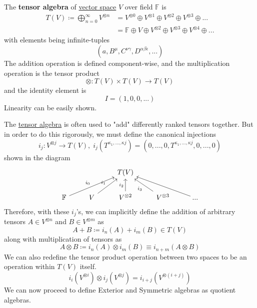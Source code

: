   \begin{definition}
    \label{def:tensor-algebra}
    The \textbf{tensor algebra} of \hyperref[def:vector-space]{vector space} $V$ over field $\mathbb{F}$ is 
    \begin{align*}
      T(V) \coloneqq \bigoplus_{n = 0}^{\infty} V^{\otimes n} & = V^{\otimes 0} \oplus V^{\otimes 1} \oplus V^{\otimes 2} \oplus V^{\otimes 3} \oplus ... \\
      & = \mathbb{F} \oplus V \oplus V^{\otimes 2} \oplus V^{\otimes 3} \oplus V^{\otimes 4} \oplus ...
    \end{align*}
    with elements being infinite-tuples
    \begin{equation}
      (a, B^\mu, C^{\nu \gamma}, D^{\alpha \beta \epsilon}, ...)
    \end{equation}
    The addition operation is defined component-wise, and the multiplication operation is the tensor product 
    \begin{equation}
      \otimes: T(V) \times T(V) \to T(V)
    \end{equation}
    and the identity element is
    \begin{equation}
      I = (1, 0, 0, ...)
    \end{equation}
    Linearity can be easily shown. 
  \end{definition}

  The \hyperref[def:tensor-algebra]{tensor algebra} is often used to "add" differently ranked tensors together. But in order to do this rigorously, we must define the canonical injections
  \begin{equation}
    i_j: V^{\otimes j} \to T(V), \; i_j (T^{\kappa_1, ..., \kappa j}) = (0, ...,0, T^{\kappa_1, ..., \kappa j}, 0, ..., 0) 
  \end{equation}
  shown in the diagram
  \begin{equation}
    \begin{tikzcd}
          & & T(V) & & \\
          \mathbb{F} \arrow{urr}{i_0} & V \arrow{ur}{i_1} & V^{\otimes 2} \arrow{u}{i_2} & V^{\otimes 3} \arrow{ul}{i_3} & ... \arrow{ull}
      \end{tikzcd}
  \end{equation}
  Therefore, with these $i_j$'s, we can implicitly define the addition of arbitrary tensors $A \in V^{\otimes n}$ and $B \in V^{\otimes m}$ as 
  \begin{equation}
    A + B \coloneqq i_n (A) + i_m (B) \in T(V)
  \end{equation}
  along with multiplication of tensors as
  \begin{equation}
    A \otimes B \coloneqq i_n(A) \otimes i_m(B) \equiv i_{n+m} (A \otimes B)
  \end{equation}
  We can also redefine the tensor product operation between two spaces to be an operation within $T(V)$ itself. 
  \begin{equation}
    i_i(V^{\otimes i}) \otimes i_j( V^{\otimes j}) = i_{i+j} (V^{\otimes (i+j)})
  \end{equation}
  We can now proceed to define Exterior and Symmetric algebras as quotient algebras. 

